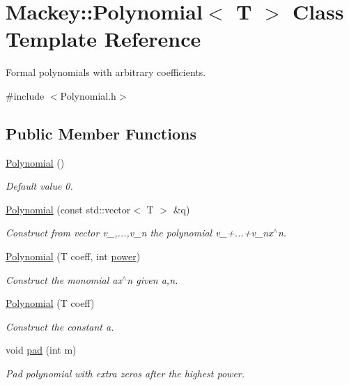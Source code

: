 \hypertarget{classMackey_1_1Polynomial}{}\section{Mackey\+:\+:Polynomial$<$ T $>$ Class Template Reference}
\label{classMackey_1_1Polynomial}


Formal polynomials with arbitrary coefficients.  




{\ttfamily \#include $<$Polynomial.\+h$>$}

\subsection*{Public Member Functions}
\begin{DoxyCompactItemize}
\item 
\hyperlink{classMackey_1_1Polynomial_a0e0bda8d8d0d5ade1cbb0b0cc79b8d56}{Polynomial} ()
\begin{DoxyCompactList}\small\item\em Default value 0. \end{DoxyCompactList}\item 
\hyperlink{classMackey_1_1Polynomial_ad14fdd66f2d9942af17e38fe8c6bb2c9}{Polynomial} (const std\+::vector$<$ T $>$ \&q)
\begin{DoxyCompactList}\small\item\em Construct from vector v\+\_,...,v\+\_\+n the polynomial v\+\_+...+v\+\_\+nx$^\wedge$n. \end{DoxyCompactList}\item 
\hyperlink{classMackey_1_1Polynomial_a61522f056a2334c51186f7ed0b35229f}{Polynomial} (T coeff, int \hyperlink{namespaceMackey_aafdaaabd06dd9ceefe6fa4f26d13a60d}{power})
\begin{DoxyCompactList}\small\item\em Construct the monomial ax$^\wedge$n given a,n. \end{DoxyCompactList}\item 
\hyperlink{classMackey_1_1Polynomial_a665435bc329352f11b1e424c126d914b}{Polynomial} (T coeff)
\begin{DoxyCompactList}\small\item\em Construct the constant a. \end{DoxyCompactList}\item 
void \hyperlink{classMackey_1_1Polynomial_ad2981034fac81d4ad3f2751c757af5d3}{pad} (int m)
\begin{DoxyCompactList}\small\item\em Pad polynomial with extra zeros after the highest power. \end{DoxyCompactList}\end{DoxyCompactItemize}

